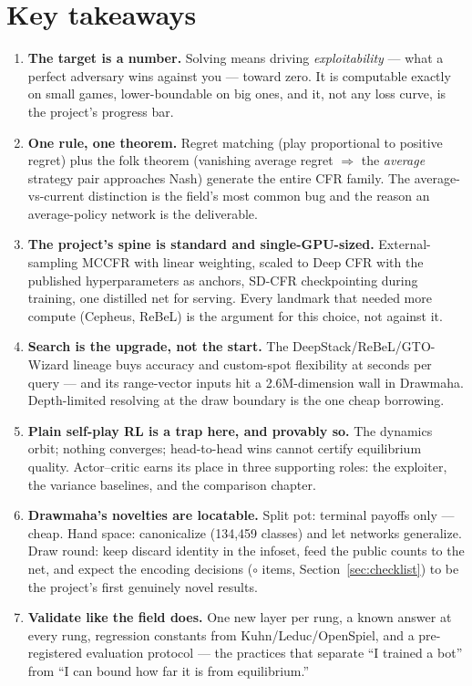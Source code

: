 \section{Key takeaways}\label{sec:takeaways}

\begin{enumerate}
\item \textbf{The target is a number.} Solving means driving \emph{exploitability} --- what a perfect adversary wins against you --- toward zero. It is computable exactly on small games, lower-boundable on big ones, and it, not any loss curve, is the project's progress bar.
\item \textbf{One rule, one theorem.} Regret matching (play proportional to positive regret) plus the folk theorem (vanishing average regret $\Rightarrow$ the \emph{average} strategy pair approaches Nash) generate the entire CFR family. The average-vs-current distinction is the field's most common bug and the reason an average-policy network is the deliverable.
\item \textbf{The project's spine is standard and single-GPU-sized.} External-sampling MCCFR with linear weighting, scaled to Deep CFR with the published hyperparameters as anchors, SD-CFR checkpointing during training, one distilled net for serving. Every landmark that needed more compute (Cepheus, ReBeL) is the argument for this choice, not against it.
\item \textbf{Search is the upgrade, not the start.} The DeepStack/ReBeL/GTO-Wizard lineage buys accuracy and custom-spot flexibility at seconds per query --- and its range-vector inputs hit a 2.6M-dimension wall in Drawmaha. Depth-limited resolving at the draw boundary is the one cheap borrowing.
\item \textbf{Plain self-play RL is a trap here, and provably so.} The dynamics orbit; nothing converges; head-to-head wins cannot certify equilibrium quality. Actor--critic earns its place in three supporting roles: the exploiter, the variance baselines, and the comparison chapter.
\item \textbf{Drawmaha's novelties are locatable.} Split pot: terminal payoffs only --- cheap. Hand space: canonicalize (134{,}459 classes) and let networks generalize. Draw round: keep discard identity in the infoset, feed the public counts to the net, and expect the encoding decisions ($\circ$ items, Section~\ref{sec:checklist}) to be the project's first genuinely novel results.
\item \textbf{Validate like the field does.} One new layer per rung, a known answer at every rung, regression constants from Kuhn/Leduc/OpenSpiel, and a pre-registered evaluation protocol --- the practices that separate ``I trained a bot'' from ``I can bound how far it is from equilibrium.''
\end{enumerate}

